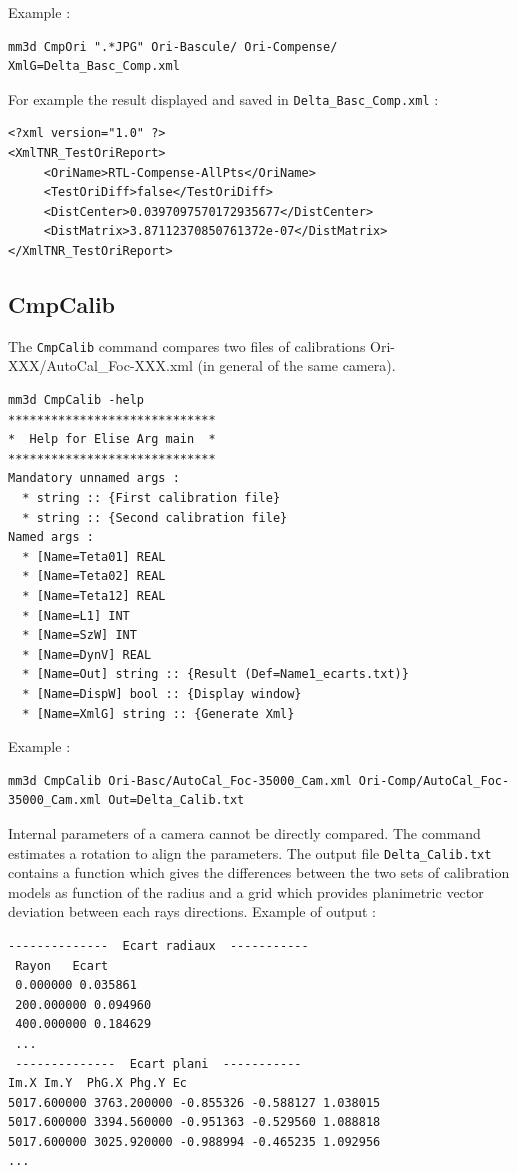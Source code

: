 Example :
\begin{verbatim}
mm3d CmpOri ".*JPG" Ori-Bascule/ Ori-Compense/ XmlG=Delta_Basc_Comp.xml
\end{verbatim}

For example the result displayed and saved in {\tt Delta\_Basc\_Comp.xml} :
\begin{verbatim}
<?xml version="1.0" ?>
<XmlTNR_TestOriReport>
     <OriName>RTL-Compense-AllPts</OriName>
     <TestOriDiff>false</TestOriDiff>
     <DistCenter>0.0397097570172935677</DistCenter>
     <DistMatrix>3.87112370850761372e-07</DistMatrix>
</XmlTNR_TestOriReport>
\end{verbatim}


\subsection{CmpCalib}
The {\tt CmpCalib} command compares two files of calibrations Ori-XXX/AutoCal\_Foc-XXX.xml (in general of the same camera).

\begin{verbatim}
mm3d CmpCalib -help
*****************************
*  Help for Elise Arg main  *
*****************************
Mandatory unnamed args : 
  * string :: {First calibration file}
  * string :: {Second calibration file}
Named args : 
  * [Name=Teta01] REAL
  * [Name=Teta02] REAL
  * [Name=Teta12] REAL
  * [Name=L1] INT
  * [Name=SzW] INT
  * [Name=DynV] REAL
  * [Name=Out] string :: {Result (Def=Name1_ecarts.txt)}
  * [Name=DispW] bool :: {Display window}
  * [Name=XmlG] string :: {Generate Xml}
\end{verbatim}

Example :
\begin{verbatim}
mm3d CmpCalib Ori-Basc/AutoCal_Foc-35000_Cam.xml Ori-Comp/AutoCal_Foc-35000_Cam.xml Out=Delta_Calib.txt
\end{verbatim}

Internal parameters of a camera cannot be directly compared. The command estimates a rotation to align the parameters.
The output file {\tt Delta\_Calib.txt} contains a function which gives the differences between the two sets of calibration models as function of the radius and 
a grid which provides planimetric vector deviation between each rays directions. Example of output :

\begin{verbatim}
--------------  Ecart radiaux  -----------
 Rayon   Ecart
 0.000000 0.035861
 200.000000 0.094960
 400.000000 0.184629
 ...
 --------------  Ecart plani  -----------
Im.X Im.Y  PhG.X Phg.Y Ec
5017.600000 3763.200000 -0.855326 -0.588127 1.038015
5017.600000 3394.560000 -0.951363 -0.529560 1.088818
5017.600000 3025.920000 -0.988994 -0.465235 1.092956
...
\end{verbatim}

